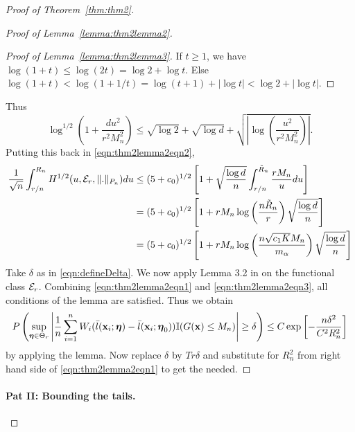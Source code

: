 \documentclass[11pt,letterpaper]{article}
\numberwithin{equation}{section}
\begin{document}
\begin{proof}[Proof of Theorem~\ref{thm:thm2}]
\begin{proof}[Proof of Lemma~\ref{lemma:thm2lemma2}]
\begin{proof}[Proof of Lemma~\ref{lemma:thm2lemma3}]
If $t \geq 1$, we have $\log(1+t) \leq \log(2t) = \log 2 + \log t$. Else $\log (1+t) < \log(1 + 1/t) = \log(t+1) + |\log t| < \log 2 + |\log t|$.
\end{proof}

Thus
%
$$
\log^{1/2} \left( 1 + \frac{ d u^2}{r^2 M_n^2} \right) \leq
\sqrt{\log 2} + \sqrt{ \log d} + \sqrt{ \left| \log \left( \frac{ u^2}{r^2 M_n^2} \right) \right| }.
$$
%
Putting this back in \eqref{eqn:thm2lemma2eqn2},
%
\begin{align}
\frac{1}{\sqrt n} \int_{r/n}^{R_n} H^{1/2} (u, {\cal{E}}_r, \|.\|_{P_n}) du & \leq
( 5 + c_0 )^{1/2} \left[ 1 + \sqrt{ \frac{ \log d}{n}} \int_{r/n}^{\tilde R_n} \frac{r M_n}{u} du \right] \notag\\
& = ( 5 + c_0 )^{1/2} \left[ 1 + r M_n 
\log \left( \frac{n \tilde R_n}{r} \right) \sqrt{ \frac{ \log d}{n}} \right] \notag\\
& = ( 5 + c_0 )^{1/2} \left[ 1 + r M_n 
\log \left( \frac{n \sqrt{c_1 K} M_n}{m_\alpha} \right) \sqrt{ \frac{ \log d}{n}} \right]
\label{eqn:thm2lemma2eqn3}
\end{align}
%
Take $\delta$ as in \eqref{eqn:defineDelta}. We now apply Lemma 3.2 in \cite{vandeGeerBook00} on the functional class ${\cal{E}}_r$. Combining \eqref{eqn:thm2lemma2eqn1} and \eqref{eqn:thm2lemma2eqn3}, all conditions of the lemma are satisfied. Thus we obtain
%
$$
P \left( \sup_{{\boldsymbol{\eta}} \in \Theta_r} \left| \frac{1}{n} \sum_{i=1}^n W_i (\bar l({\bf{x}}_i; {\boldsymbol{\eta}}) -  \bar l( {\bf{x}}_i; {\boldsymbol{\eta}}_0)) {\mathbb{I}}(G({\bf{x}}) \leq M_n ) \right| \geq \delta \right) \leq
C \exp \left[ - \frac{n \delta^2}{ C^2 R_n^2} \right]
$$
%
by applying the lemma. Now replace $\delta$ by $Tr \delta$ and substitute for $R_n^2$ from right hand side of \eqref{eqn:thm2lemma2eqn1} to get the needed.
\end{proof}

\paragraph{Pat II: Bounding the tails.}
\end{proof}




\end{document}
